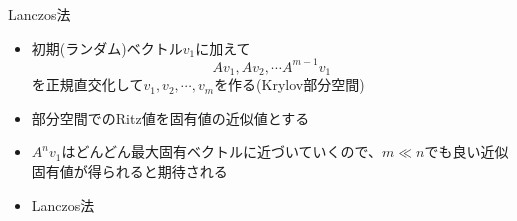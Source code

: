 \begin{frame}[t,fragile]{Lanczos法}
  \begin{itemize}
    \setlength{\itemsep}{1em}
  \item 初期(ランダム)ベクトル$v_1$に加えて
    \[
    Av_1, Av_2, \cdots A^{m-1}v_1
    \]
    を正規直交化して$v_1,v_2,\cdots,v_m$を作る(Krylov部分空間)
  \item 部分空間でのRitz値を固有値の近似値とする
  \item $A^nv_1$はどんどん最大固有ベクトルに近づいていくので、$m \ll n$でも良い近似固有値が得られると期待される
  \item Lanczos法
  \end{itemize}
\end{frame}

